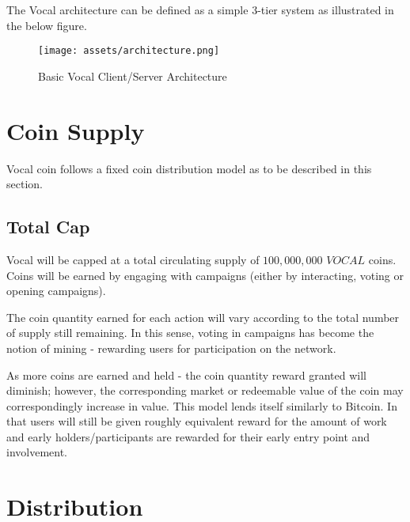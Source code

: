 \documentclass[conference]{IEEEtran}
\begin{document}
    The Vocal architecture can be defined as a simple 3-tier system as illustrated in the below figure.

    \begin{figure}[t]
      \texttt{[image: assets/architecture.png]}
      \caption{Basic Vocal Client/Server Architecture}
      \centering
    \end{figure}


    
    \section{Coin Supply}

   Vocal coin follows a fixed coin distribution model as to be described in this section.

    \subsection{Total Cap}
   Vocal will be capped at a total circulating supply of $100,000,000$ $VOCAL$ coins. Coins will be earned by engaging with campaigns (either by interacting, voting or opening campaigns).

     The coin quantity earned for each action will vary according to the total number of supply still remaining. In this sense, voting in campaigns has become the notion of mining - rewarding users for participation on the network.

     As more coins are earned and held - the coin quantity reward granted will diminish; however, the corresponding market or redeemable value of the coin may correspondingly increase in value. This model lends itself similarly to Bitcoin. In that users will still be given roughly equivalent reward for the amount of work and early holders/participants are rewarded for their early entry point and involvement.

    \section{Distribution}
\end{document}
